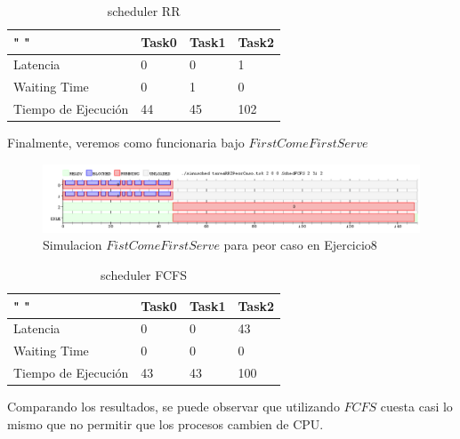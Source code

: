 \documentclass[11pt]{article}
\begin{document}
\begin{enumerate}
  \begin{table}[htb]
  \centering
  \begin{tabular}{| l | l | l | l |}
  \hline
  " " & Task0 & Task1 & Task2 \\
  \hline \hline
  Latencia & 0 & 0 & 1 \\ \hline
  Waiting Time & 0 & 1 & 0 \\ \hline
  Tiempo de Ejecución & 44 & 45 & 102 \\ \hline
  \end{tabular}
  \caption{scheduler RR}
  \end{table}


  Finalmente, veremos como funcionaria bajo $First Come First Serve$

    \begin{figure}[H]
      \includegraphics[scale=0.5]{Ej8PeorCasoFCFS}
      \caption{Simulacion $Fist Come First Serve$ para peor caso en Ejercicio8}
    \end{figure}

  \begin{table}[htb]
  \centering
  \begin{tabular}{| l | l | l | l |}
  \hline
  " " & Task0 & Task1 & Task2 \\
  \hline \hline
  Latencia & 0 & 0 & 43 \\ \hline
  Waiting Time & 0 & 0 & 0 \\ \hline
  Tiempo de Ejecución & 43 & 43 & 100 \\ \hline
  \end{tabular}
  \caption{scheduler FCFS}
  \end{table}


  Comparando los resultados, se puede observar que utilizando $FCFS$ cuesta casi lo mismo que no permitir que los procesos cambien de CPU.



\end{enumerate}
\end{document}
